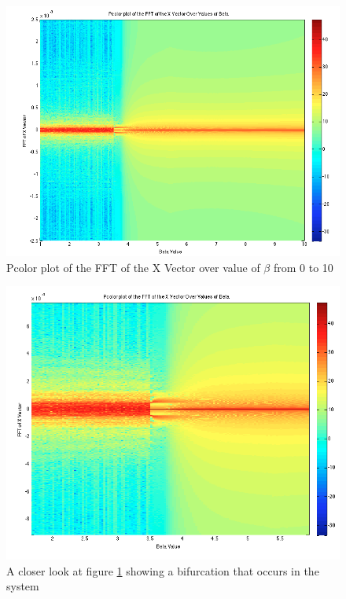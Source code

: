 \documentclass{article}[11pt]
\begin{document}
\begin{figure}[H]
\centering
\includegraphics[totalheight=0.4\textheight]{images/pcolor2.png}
\caption{Pcolor plot of the FFT of the X Vector over value of $\beta$ from 0 to 10}
\label{fig:pcolor2}
\end{figure}
\begin{figure}[H]
\centering
\includegraphics[totalheight=0.4\textheight]{images/pcolor3.png}
\caption{A closer look at figure \ref{fig:pcolor2} showing a bifurcation that occurs in the system}
\label{fig:pcolor3}
\end{figure}
\end{document}
